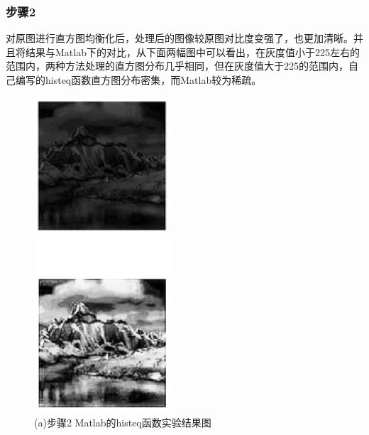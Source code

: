 \documentclass[]{IEEEphot}
\begin{document}
\subsubsection{步骤2}
对原图进行直方图均衡化后，处理后的图像较原图对比度变强了，也更加清晰。并且将结果与Matlab下的对比，从下面两幅图中可以看出，在灰度值小于225左右的范围内，两种方法处理的直方图分布几乎相同，但在灰度值大于225的范围内，自己编写的histeq函数直方图分布密集，而Matlab较为稀疏。\\
\begin{figure}[h]
	\includegraphics[width=12pc]{mexp_2_2.eps}
	\caption{(a)步骤2 Matlab的histeq函数实验结果图}
\end{figure}
\end{document}
